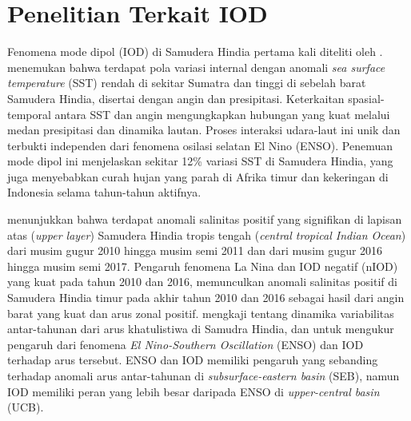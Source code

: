 \vspace{1.5pc}
\vspace{-1pc}
\section[Penelitian Terkait IOD]{Penelitian Terkait IOD}
\begin{spacing}{1.5}
	Fenomena mode dipol (IOD) di Samudera Hindia pertama kali diteliti oleh .  menemukan bahwa terdapat pola variasi internal dengan anomali \textit{sea surface temperature} (SST) rendah di sekitar Sumatra dan tinggi di sebelah barat Samudera Hindia, disertai dengan angin dan presipitasi. Keterkaitan spasial-temporal antara SST dan angin mengungkapkan hubungan yang kuat melalui medan presipitasi dan dinamika lautan. Proses interaksi udara-laut ini unik dan terbukti independen dari fenomena osilasi selatan El Nino (ENSO). Penemuan mode dipol ini menjelaskan sekitar 12\% variasi SST di Samudera Hindia, yang juga menyebabkan curah hujan yang parah di Afrika timur dan kekeringan di Indonesia selama tahun-tahun aktifnya.
	
	 menunjukkan bahwa terdapat anomali salinitas positif yang signifikan di lapisan atas (\textit{upper layer}) Samudera Hindia tropis tengah (\textit{central tropical Indian Ocean}) dari musim gugur 2010 hingga musim semi 2011 dan dari musim gugur 2016 hingga musim semi 2017. Pengaruh fenomena La Nina dan IOD negatif (nIOD) yang kuat pada tahun 2010 dan 2016, memunculkan anomali salinitas positif di Samudera Hindia timur pada akhir tahun 2010 dan 2016 sebagai hasil dari angin barat yang kuat dan arus zonal positif.  mengkaji tentang dinamika variabilitas antar-tahunan dari arus khatulistiwa di Samudra Hindia, dan untuk mengukur pengaruh dari fenomena \textit{El Nino-Southern Oscillation} (ENSO) dan IOD terhadap arus tersebut. ENSO dan IOD memiliki pengaruh yang sebanding terhadap anomali arus antar-tahunan di \textit{subsurface-eastern basin} (SEB), namun IOD memiliki peran yang lebih besar daripada ENSO di \textit{upper-central basin} (UCB). 
	

\end{spacing}

